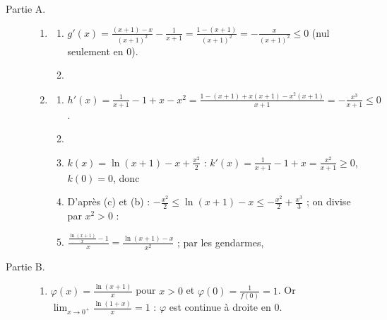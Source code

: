 \begin{description}
	\item[Partie A.]
	\begin{enumerate}
		\item
		\begin{enumerate}
			\item {}
				$g'(x) = \frac{(x+1) - x}{(x+1)^2} - \frac{1}{x+1} = \frac{1 - (x+1)}{(x+1)^2} = -\frac{x}{(x+1)^2} \leq 0$ (nul seulement en $0$).
				\par\noindent\ansbox{$g$ est strictement décroissante sur $[0;+\infty[$, avec $g(0) = 0$.}
			\item {}
		\end{enumerate}
		\item
		\begin{enumerate}
			\item {}
				$h'(x) = \frac{1}{x+1} - 1 + x - x^2 = \frac{1 - (x+1) + x(x+1) - x^2(x+1)}{x+1} = -\frac{x^3}{x+1} \leq 0$.
				\par\noindent\ansbox{$h$ est décroissante sur $[0;+\infty[$, avec $h(0) = 0$.}
			\item {}
			\item {}
				$k(x) = \ln(x+1) - x + \frac{x^2}{2}$ : $k'(x) = \frac{1}{x+1} - 1 + x = \frac{x^2}{x+1} \geq 0$, $k(0) = 0$, donc
				\par\noindent{}
			\item {}
				D'après (c) et (b) : $-\frac{x^2}{2} \leq \ln(x+1) - x \leq -\frac{x^2}{2} + \frac{x^3}{3}$ ; on divise par $x^2 > 0$ :
				\par\noindent{}
			\item {}
				$\frac{\frac{\ln(x+1)}{x} - 1}{x} = \frac{\ln(x+1) - x}{x^2}$ ; par les gendarmes,
				\par\noindent{}
		\end{enumerate}
	\end{enumerate}
	\item[Partie B.]
	\begin{enumerate}
		\item {}
			$\varphi(x) = \frac{\ln(x+1)}{x}$ pour $x > 0$ et $\varphi(0) = \frac{1}{f(0)} = 1$. Or $\lim_{x\to 0^+}\frac{\ln(1+x)}{x} = 1$ : $\varphi$ est continue à droite en $0$.

\end{enumerate}
\end{description}
